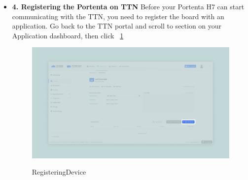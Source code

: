 \begin{itemize}
	The only line you may need to change before uploading the code is the one that sets the frequency. Set the frequency code according to your country if needed. You can find more information about frequency by country at this TTN link.
	
	\begin{lstlisting}[language=C++, frame=single, numbers=left, basicstyle=\ttfamily\small]
		// change this to your regional band (eg. US915, AS923, ...)
		if (!modem.begin(EU868)) {    ...
	\end{lstlisting}
	
	Once you have added to the sketch the frequency according to your country, you can upload it to the board. Then, when the upload is completed, open the Serial Monitor. The following details will show up:
	
	\begin{lstlisting}[language=C++, frame=single, numbers=left, basicstyle=\ttfamily\small]
		Your module version is: ARD-078 1.2.1
		Your device EUI is: a8xxxxxxxxxxxxxx
		Are you connecting via OTAA (1) or ABP (2)?
	\end{lstlisting}
	
	In order to select the way in which the board is going to connect with TTN (OTAA or ABP), you need to configure it on the TTN portal. You will see which option you should select in the following steps.
	
	\item \textbf{4. Registering the Portenta on TTN} Before your Portenta H7 can start communicating with the TTN, you need to register the board with an application. Go back to the TTN portal and scroll to  section on your Application dashboard, then click  ~\ref{RegisteringDevice} \cite{connecting_to_ttn_portenta_vision_shield:2024} 
	
	\begin{figure}
		\begin{center}
			\includegraphics[width=0.7\linewidth]{Images/LORA/RegisteringDevice.png}
			\caption{RegisteringDevice}
			\label{RegisteringDevice} \cite{connecting_to_ttn_portenta_vision_shield:2024}
		\end{center}
	\end{figure}
	

\end{itemize}
